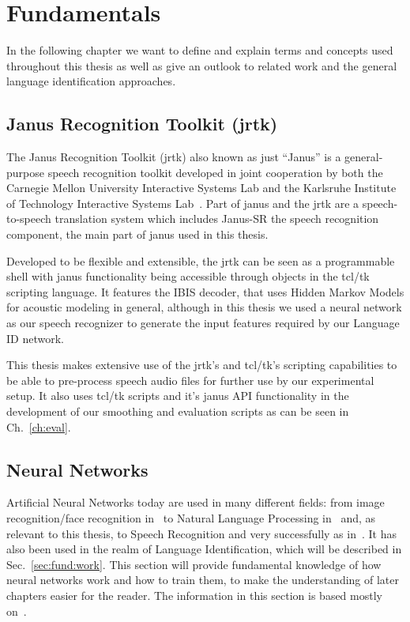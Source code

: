 

\chapter{Fundamentals}
\label{ch:fund}

In the following chapter we want to define and explain terms and concepts used throughout this thesis as well as give an outlook to related work and the general language identification approaches.

\section{Janus Recognition Toolkit (jrtk)}
\label{sec:fund:jrtk}
The Janus Recognition Toolkit (jrtk) also known as just ``Janus'' is a general-purpose speech recognition toolkit developed in joint cooperation by both the Carnegie Mellon University Interactive Systems Lab and the Karlsruhe Institute of Technology Interactive Systems Lab~\cite{lavie1997janus}. Part of janus and the jrtk are a speech-to-speech translation system which includes Janus-SR the speech recognition component, the main part of janus used in this thesis. 

Developed to be flexible and extensible, the jrtk can be seen as a programmable shell with janus functionality being accessible through objects in the tcl/tk scripting language. It features the IBIS decoder, that uses Hidden Markov Models for acoustic modeling in general, although in this thesis we used a neural network as our speech recognizer to generate the input features required by our Language ID network.

This thesis makes extensive use of the jrtk's and tcl/tk's scripting capabilities to be able to pre-process speech audio files for further use by our experimental setup. It also uses tcl/tk scripts and it's janus API functionality in the development of our smoothing and evaluation scripts as can be seen in Ch.~\ref{ch:eval}.
\section{Neural Networks}
\label{sec:fund:NN}
Artificial Neural Networks today are used in many different fields: from image recognition/face recognition in~\cite{lawrence1997face} to Natural Language Processing in~\cite{collobert2008unified} and, as relevant to this thesis, to Speech Recognition and very successfully as in~\cite{hinton2012deep}. It has also been used in the realm of Language Identification, which will be described in Sec.~\ref{sec:fund:work}. This section will provide fundamental knowledge of how neural networks work and how to train them, to make the understanding of later chapters easier for the reader. The information in this section is based mostly on~\cite{haykin2004comprehensive}.

